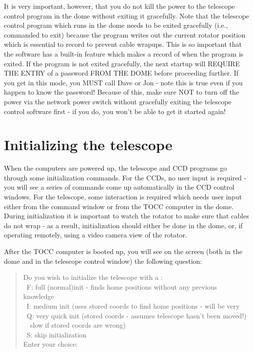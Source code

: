 \documentclass[10pt]{report}
\renewcommand{\[}{\begin{eqnarray}}
\renewcommand{\]}{\end{eqnarray}}
\begin{document}
It is very important, however, that you do not kill the power to the
telescope control program in the dome without exiting it gracefully.
Note that the telescope control program which runs in the dome 
needs to be exited gracefully
(i.e., commanded to exit) because the program writes out the current
rotator position which is essential to record to prevent cable wrapups.
This is so important that the software has a built-in feature which 
makes a record of when the program is exited. If the program is not
exited gracefully, the next startup will REQUIRE THE ENTRY of a password
FROM THE DOME before proceeding further. If you get in this mode, you
MUST call Dave or Jon - note this is true even if you happen to know the
password! Because of this, make sure NOT to turn off the power via the
network power switch without gracefully exiting the telescope control
software first - if you do, you won't be able to get it started again!

\section{Initializing the telescope}

When the computers are powered up, the telescope and CCD programs go
through some initialization commands. For the CCDs, no user input is 
required - you will see a series of commands come up automatically in
the CCD control windows. For the telescope, some interaction is required
which needs user input either from the command window
or from the TOCC computer in the dome. During initialization it is important
to watch the rotator to make sure that cables do not wrap - as a result,
initialization should either be done in the dome, or, if operating remotely,
using a video camera view of the rotator.

After the TOCC computer is booted up, you will see on the screen (both
in the dome and in the telescope control window) the following question:

\begin{quote}
Do you wish to initialize the telescope with a :\\
\  F: full (normal)init - finds home positions without any previous knowledge\\
\ I: medium init (uses stored coords to find home positions - will be very\\
\ Q: very quick init (stored coords - assumes telescope hasn't been moved!)\\
\ \    slow if stored coords are wrong)\\
\  S: skip initialization\\
Enter your choice: \\
\end{quote}
\end{document}

